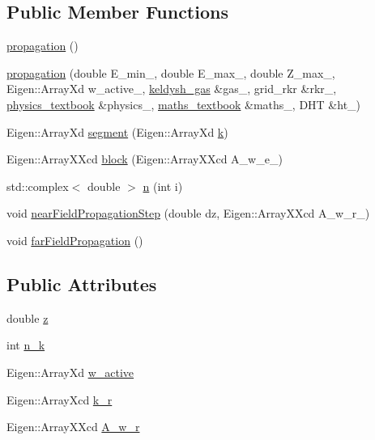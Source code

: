 \subsection*{Public Member Functions}
\begin{DoxyCompactItemize}
\item 
\hyperlink{classpropagation_a9d7b9f42ce1c0bc741d3016a07ba13f7}{propagation} ()
\item 
\hyperlink{classpropagation_a082efa11767639ade0eaf0f8856cc410}{propagation} (double E\+\_\+min\+\_\+, double E\+\_\+max\+\_\+, double Z\+\_\+max\+\_\+, Eigen\+::\+Array\+Xd w\+\_\+active\+\_\+, \hyperlink{classkeldysh__gas}{keldysh\+\_\+gas} \&gas\+\_\+, grid\+\_\+rkr \&rkr\+\_\+, \hyperlink{classphysics__textbook}{physics\+\_\+textbook} \&physics\+\_\+, \hyperlink{classmaths__textbook}{maths\+\_\+textbook} \&maths\+\_\+, D\+HT \&ht\+\_\+)
\item 
Eigen\+::\+Array\+Xd \hyperlink{classpropagation_a39126bbbd4977c140c0077b849e78bc1}{segment} (Eigen\+::\+Array\+Xd \hyperlink{classpropagation_a49a30e941421cd5e3f0b62bd1335a767}{k})
\item 
Eigen\+::\+Array\+X\+Xcd \hyperlink{classpropagation_af12b15d9b91f98516c0ff25efc1233d1}{block} (Eigen\+::\+Array\+X\+Xcd A\+\_\+w\+\_\+e\+\_\+)
\item 
std\+::complex$<$ double $>$ \hyperlink{classpropagation_a7c696d9e54e5f0a7735047e28aee4866}{n} (int i)
\item 
void \hyperlink{classpropagation_a65e272beb6b5b73f433456361bcde914}{near\+Field\+Propagation\+Step} (double dz, Eigen\+::\+Array\+X\+Xcd A\+\_\+w\+\_\+r\+\_\+)
\item 
void \hyperlink{classpropagation_a9c2e1cb4e314c173b26de08ffcfe071d}{far\+Field\+Propagation} ()
\end{DoxyCompactItemize}
\subsection*{Public Attributes}
\begin{DoxyCompactItemize}
\item 
double \hyperlink{classpropagation_aeacfc091fafd1fdb1af4536f6f587e55}{z}
\item 
int \hyperlink{classpropagation_a93033ee98c04a6fe007eae5c856e76b3}{n\+\_\+k}
\item 
Eigen\+::\+Array\+Xd \hyperlink{classpropagation_a4c24f42d4148eded469c6479d6bf1661}{w\+\_\+active}
\item 
Eigen\+::\+Array\+Xcd \hyperlink{classpropagation_a9e437271e452fa1732f50e006347b501}{k\+\_\+r}
\item 
Eigen\+::\+Array\+X\+Xcd \hyperlink{classpropagation_ad3a84addde67e43bbb606408193f78ee}{A\+\_\+w\+\_\+r}
\end{DoxyCompactItemize}
